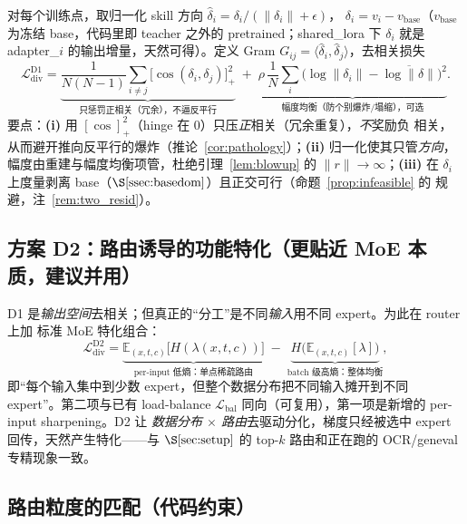 \documentclass[11pt,a4paper]{article}
\newcommand{\loss}{\mathcal{L}}
\newcommand{\E}{\mathbb{E}}
\newcommand{\base}{\mathrm{base}}
\newcommand{\vbase}{v_{\base}}
\theoremstyle{definition}
\begin{document}
对每个训练点，取归一化 skill 方向 $\hat\delta_i=\delta_i/(\|\delta_i\|+\epsilon)$，
$\delta_i=v_i-\vbase$（$\vbase$ 为冻结 base，代码里即 teacher 之外的 pretrained；shared\_lora 下
$\delta_i$ 就是 adapter\_$i$ 的输出增量，天然可得）。定义 Gram $G_{ij}=\langle\hat\delta_i,
\hat\delta_j\rangle$，去相关损失
\begin{equation}
\loss_{\mathrm{div}}^{\mathrm{D1}}
=\underbrace{\frac{1}{N(N-1)}\sum_{i\neq j}\big[\cos(\delta_i,\delta_j)\big]_+^2}_{\text{只惩罚正相关（冗余），不逼反平行}}
\;+\;\underbrace{\rho\,\frac{1}{N}\sum_i\big(\log\|\delta_i\|-\overline{\log\|\delta\|}\big)^2}_{\text{幅度均衡（防个别爆炸/塌缩），可选}} .
\label{eq:d1}
\end{equation}
要点：\textbf{(i)} 用 $[\cos]_+^2$（hinge 在 $0$）只压\emph{正}相关（冗余重复），\emph{不}奖励负
相关，从而避开推向反平行的爆炸（推论~\ref{cor:pathology}）；\textbf{(ii)} 归一化使其只管\emph{方向}，
幅度由重建与幅度均衡项管，杜绝引理~\ref{lem:blowup} 的 $\|r\|\to\infty$；\textbf{(iii)} 在
$\delta_i$ 上度量剥离 base（$\S\ref{ssec:basedom}$）且正交可行（命题~\ref{prop:infeasible} 的
规避，注~\ref{rem:two_resid}）。

\subsection{方案 D2：路由诱导的功能特化（更贴近 MoE 本质，建议并用）}
\label{ssec:d2}

D1 是\emph{输出空间}去相关；但真正的``分工''是不同\emph{输入}用不同 expert。为此在 router 上加
标准 MoE 特化组合：
\begin{equation}
\loss_{\mathrm{div}}^{\mathrm{D2}}
=\underbrace{\E_{(x,t,c)}\big[H(\lambda(x,t,c))\big]}_{\text{per-input 低熵：单点稀疏路由}}
\;-\;\underbrace{H\big(\E_{(x,t,c)}[\lambda]\big)}_{\text{batch 级高熵：整体均衡}} ,
\label{eq:d2}
\end{equation}
即``每个输入集中到少数 expert，但整个数据分布把不同输入摊开到不同 expert''。第二项与已有
load-balance $\loss_{\mathrm{bal}}$ 同向（可复用），第一项是新增的 per-input sharpening。D2 让
\emph{数据分布 $\times$ 路由}去驱动分化，梯度只经被选中 expert 回传，天然产生特化——与
$\S\ref{sec:setup}$ 的 top-$k$ 路由和正在跑的 OCR/geneval 专精现象一致。

\subsection{路由粒度的匹配（代码约束）}
\label{ssec:granularity}
\end{document}
